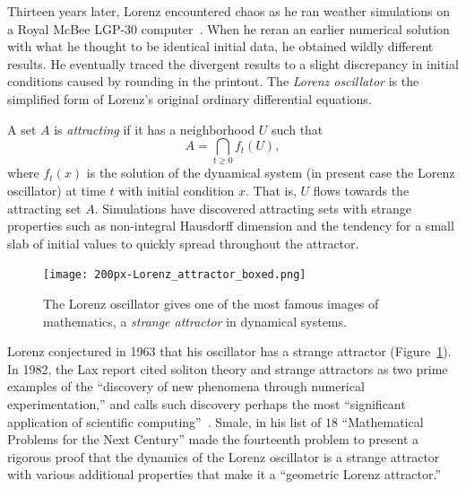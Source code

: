 \documentclass{llncs}
\begin{document}
Thirteen years later, Lorenz encountered chaos as he ran weather
simulations on a Royal McBee LGP-30 computer~\cite{Lo63}.  When he
reran an earlier numerical solution with what he thought to be
identical initial data, he obtained wildly different results.  He
eventually traced the divergent results to a slight discrepancy in
initial conditions caused by rounding in the printout.  The {\it Lorenz
  oscillator} is the simplified form of Lorenz's original ordinary
differential equations.

A set $A$ is {\it attracting} if it has a neighborhood $U$ such
that
\[
A = \bigcap_{t\ge 0} f_t(U),
\]
where $f_t(x)$ is the solution of the dynamical system (in present
case the Lorenz oscillator) at time $t$ with initial condition
$x$. That is, $U$ flows towards the attracting set $A$.  Simulations
have discovered attracting sets with strange properties such as
non-integral Hausdorff dimension and the tendency for a small slab of
initial values to quickly spread throughout the attractor.



% 

\begin{figure}[h!]
  \centering
\texttt{[image: 200px-Lorenz\_attractor\_boxed.png]}
  \caption{The Lorenz oscillator gives one of the
most famous images of mathematics, a {\it strange attractor} in
dynamical systems.}
\label{fig:lorenz}
\end{figure}


Lorenz conjectured in 1963 that his oscillator has a strange attractor
(Figure~\ref{fig:lorenz}).  In 1982, the Lax report cited soliton
theory and strange attractors as two prime examples of the ``discovery
of new phenomena through numerical experimentation,'' and calls such
discovery perhaps the most ``significant application of scientific
computing''~\cite{Lax}.  Smale, in his list of $18$ ``Mathematical
Problems for the Next Century'' made the fourteenth problem to present
a rigorous proof that the dynamics of the Lorenz oscillator is a
strange attractor~\cite{Sma98} with various additional properties that
make it a ``geometric Lorenz attractor.''
\end{document}
